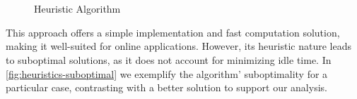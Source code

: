 \begin{figure}[htb]
    \myfloatalign
     \quad
     \\
     \quad
     \\
    \caption{Heuristic Algorithm}\label{fig:heuristic-steps}
\end{figure}

This approach offers a simple implementation and fast computation solution, making it well-suited for online applications. However, its heuristic nature leads to suboptimal solutions, as it does not account for minimizing idle time. In \autoref{fig:heuristics-suboptimal} we exemplify the algorithm' suboptimality for a particular case, contrasting with a better solution to support our analysis.


